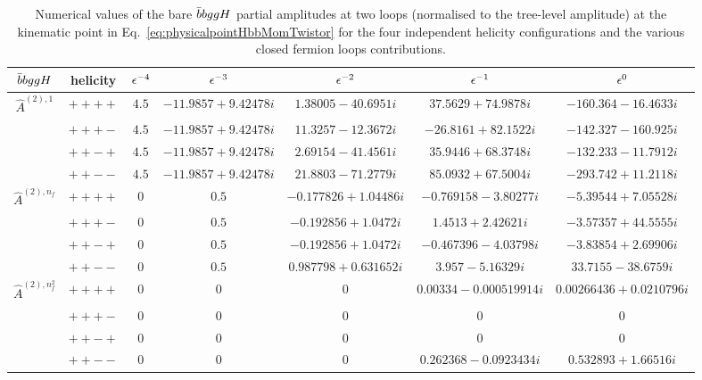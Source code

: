 \documentclass[main.tex]{subfiles}
\begin{document}
\begin{table}[t!]
\centering
\begin{tabularx}{1.0\textwidth}{|C{0.7}|C{0.8}|C{0.6}|C{1.2}|C{1.2}|C{1.2}|C{1.3}|}
\hline
 $\bar{b}bggH$     & helicity & $\epsilon^{-4}$ & $\epsilon^{-3}$ & $\epsilon^{-2}$ & $\epsilon^{-1}$ & $\epsilon^{0}$ \\
\hline
$\hat A^{(2),1}$ & $++++$ & $ 4.5$ & $ -11.9857 + 9.42478 i$ & $ 1.38005 - 40.6951 i$ & $ 37.5629 + 74.9878 i$ & $ -160.364 - 16.4633 i $ \\
                 & $+++-$ & $ 4.5$ & $ -11.9857 + 9.42478 i$ & $ 11.3257 - 12.3672 i$ & $ -26.8161 + 82.1522 i$ & $ -142.327 - 160.925 i $ \\
                 & $++-+$ & $ 4.5$ & $ -11.9857 + 9.42478 i$ & $ 2.69154 - 41.4561 i$ & $ 35.9446 + 68.3748 i$ & $ -132.233 - 11.7912 i $ \\
                 & $++--$ & $ 4.5$ & $ -11.9857 + 9.42478 i$ & $ 21.8803 - 71.2779 i$ & $ 85.0932 + 67.5004 i$ & $ -293.742 + 11.2118 i $ \\
\hline
$\hat A^{(2),n_f}$  & $++++$ & $ 0$ & $ 0.5$ & $ -0.177826 + 1.04486 i$ & $ -0.769158 - 3.80277 i$ & $ -5.39544 + 7.05528 i $ \\
                    & $+++-$ & $ 0$ & $ 0.5$ & $ -0.192856 + 1.0472 i$ & $ 1.4513 + 2.42621 i$ & $ -3.57357 + 44.5555 i $ \\
                    & $++-+$ & $ 0$ & $ 0.5$ & $ -0.192856 + 1.0472 i$ & $ -0.467396 - 4.03798 i$ & $ -3.83854 + 2.69906 i $ \\
                    & $++--$ & $ 0$ & $ 0.5$ & $ 0.987798 + 0.631652 i$ & $ 3.957 - 5.16329 i$ & $ 33.7155 - 38.6759 i $ \\
\hline
$\hat A^{(2),n_f^2}$ & $++++$ & $ 0$ & $ 0$ & $ 0$ & $ 0.00334 - 0.000519914 i$ & $ 0.00266436 + 0.0210796 i $ \\
                     & $+++-$ & $ 0$ & $ 0$ & $ 0$ & $ 0$ & $ 0 $ \\
                     & $++-+$ & $ 0$ & $ 0$ & $ 0$ & $ 0$ & $ 0 $ \\
                     & $++--$ & $ 0$ & $ 0$ & $ 0$ & $ 0.262368 - 0.0923434 i$ & $ 0.532893 + 1.66516 i $ \\
\hline
\end{tabularx}
\caption{\label{tab:benchmark2g2bHbare} Numerical values of the bare $\bar{b}bggH$ partial amplitudes at two loops (normalised to the tree-level amplitude) at the kinematic point in Eq.~\ref{eq:physicalpointHbbMomTwistor} for the four independent helicity configurations and the various closed fermion loops contributions.}
\end{table}
\end{document}
